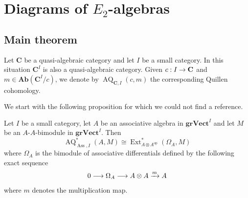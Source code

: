 \documentclass[10pt]{amsart}
\theoremstyle{definition}\newtheorem{defi}[theo]{Definition}\newtheorem{rema}[theo]{Remark}\newtheorem{exam}[theo]{Example}\newtheorem{exem}[theo]{Example}\newtheorem{nota}[theo]{Notation}
\DeclareMathOperator{\opp}{op}
\DeclareMathOperator{\Ass}{Ass}
\DeclareMathOperator{\Ext}{Ext}
\DeclareMathOperator{\AQ}{AQ}
\newcommand{\grVect}{\mathbf{grVect}}
\newcommand{\bAb}{\mathbf{Ab}}
\newcommand{\bfC}{\mathbf{C}}
\renewcommand*{\to}{\mathchoice{\longrightarrow}{\rightarrow}{\rightarrow}{\rightarrow}}
\begin{document}
\section{Diagrams of \texorpdfstring{$E_2$}{E\_2}-algebras}

\subsection{Main theorem}

Let $\bfC$ be a quasi-algebraic category and let $I$ be a small category. In this situation $\bfC^I$ is also a quasi-algebraic category. Given $c: I\to\bfC$ and $m\in\bAb(\bfC^I/c)$, we denote by $\AQ_{\bfC,I}(c,m)$ the corresponding Quillen cohomology.

We start with the following proposition for which we could not find a reference.

\begin{prop}
Let $I$ be a small category, let $A$ be an associative algebra in $\grVect^I$ and let $M$ be an $A$-$A$-bimodule in $\grVect^I$. Then
\[
\AQ^*_{\Ass,I}(A,M)\cong \Ext^*_{A\otimes A^{\opp}}(\Omega_A,M)
\]
where $\Omega_A$ is the bimodule of associative differentials defined by the following exact sequence
\[
0\to \Omega_A\to A\otimes A\xrightarrow{m}A
\]
where $m$ denotes the multiplication map.
\end{prop}
\end{document}
